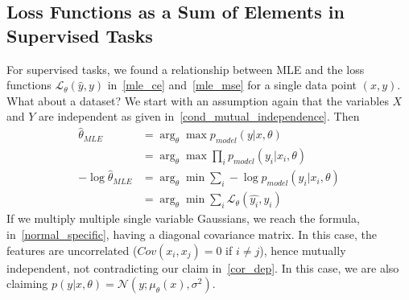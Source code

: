 \documentclass{book}
\numberwithin{equation}{subsection}
\begin{document}
\subsection{Loss Functions as a Sum of Elements in Supervised Tasks}
For supervised tasks, we found a relationship between MLE and the loss functions $\mathcal{L}_\theta(\hat{y},y)$ in~\ref{mle_ce} and~\ref{mle_mse} for a single data point $(x,y)$. What about a dataset? We start with an assumption again that the variables $X$ and $Y$ are independent as given in~\ref{cond_mutual_independence}. Then
\begin{align}
    \hat{\theta}_{MLE}
    &= \arg_\theta \max p_{model}(y|x,\theta)\\
    &= \arg_\theta \max \prod_i p_{model}(y_i|x_i,\theta)\\
    -\log\hat{\theta}_{MLE}
    &= \arg_\theta \min \sum_i -\log p_{model}(y_i|x_i,\theta)\\
    &= \arg_\theta \min \sum_i \mathcal{L}_\theta(\hat{y_i},y_i)\label{loss_sum_res}
\end{align}
If we multiply multiple single variable Gaussians, we reach the formula, in~\ref{normal_specific}, having a diagonal covariance matrix. In this case, the features are uncorrelated ($Cov(x_i,x_j)=0$ if $i \neq j$), hence mutually independent, not contradicting our claim in~\ref{cor_dep}. In this case, we are also claiming $p(y|x,\theta)=\mathcal{N}(y; \mu_\theta(x),\sigma^2)$.
\end{document}
